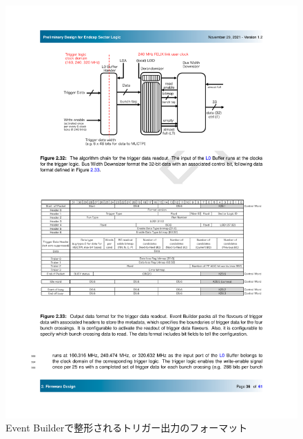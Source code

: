 \begin{itemize}
    \begin{figure} 
    \centering
    \includegraphics[width=16cm]{fig/Test/TriggerReadout_format.pdf}
    \caption[Event Builderで整形されるトリガー出力のフォーマット]{Event Builderで整形されるトリガー出力のフォーマット\cite{SLPDR}}
    \label{TriggerReadout_format}
    \end{figure}
\end{itemize}

